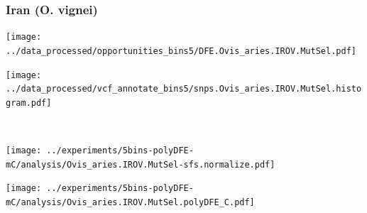 \subsubsection{Iran (O. vignei)}

\begin{minipage}{0.49\linewidth}
    \texttt{[image: ../data\_processed/opportunities\_bins5/DFE.Ovis\_aries.IROV.MutSel.pdf]}
\end{minipage}
\begin{minipage}{0.49\linewidth}
    \texttt{[image: ../data\_processed/vcf\_annotate\_bins5/snps.Ovis\_aries.IROV.MutSel.histogram.pdf]}
\end{minipage}
\\
\begin{minipage}{0.49\linewidth}
    \texttt{[image: ../experiments/5bins-polyDFE-mC/analysis/Ovis\_aries.IROV.MutSel-sfs.normalize.pdf]}
\end{minipage}
\begin{minipage}{0.4\linewidth}
    \texttt{[image: ../experiments/5bins-polyDFE-mC/analysis/Ovis\_aries.IROV.MutSel.polyDFE\_C.pdf]}
\end{minipage}
